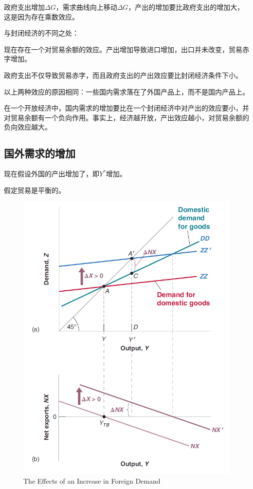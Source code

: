 \documentclass{article}
\begin{document}
政府支出增加$ \Delta G $，需求曲线向上移动$ \Delta G $，产出的增加要比政府支出的增加大，这是因为存在乘数效应。

与封闭经济的不同之处：

现在存在一个对贸易余额的效应。产出增加导致进口增加，出口并未改变，贸易赤字增加。

政府支出不仅导致贸易赤字，而且政府支出的产出效应要比封闭经济条件下小。

以上两种效应的原因相同：一些国内需求落在了外国产品上，而不是国内产品上。

在一个开放经济中，国内需求的增加要比在一个封闭经济中对产出的效应要小，并对贸易余额有一个负向作用。事实上，经济越开放，产出效应越小，对贸易余额的负向效应越大。

\subsection{国外需求的增加}

现在假设外国的产出增加了，即$ Y^* $增加。

假定贸易是平衡的。

\begin{figure}[H] %
	\centering %
	\includegraphics[width=1\textwidth]{18_6} %
	\caption{The Effects of an Increase
		in Foreign Demand} %
	\label{Fig.main6} %
\end{figure}
\end{document}
